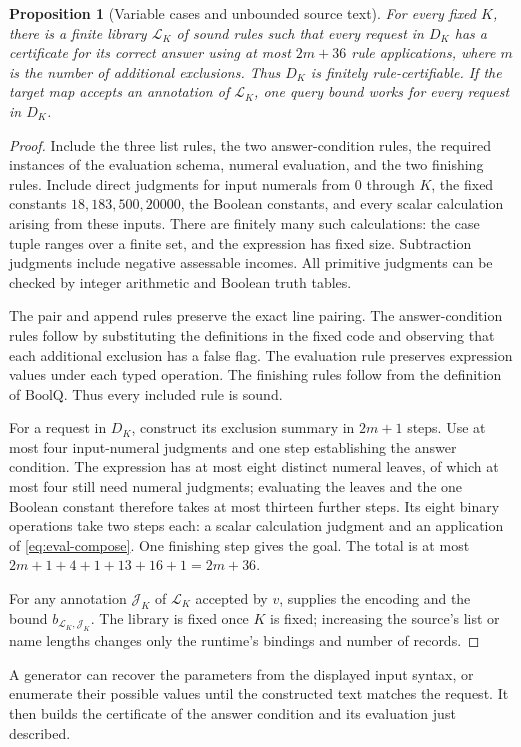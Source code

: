 \documentclass[11pt,twoside]{article}
\newtheorem{proposition}[theorem]{Proposition}
\theoremstyle{definition}
\newcommand{\Lib}{\mathcal L}
\newcommand{\Annot}{\mathcal J}
\begin{document}
\begin{proposition}[Variable cases and unbounded source text]
For every fixed $K$, there is a finite library $\Lib_K$ of sound rules such
that every request in $D_K$ has a certificate for its correct
answer using at most $2m+36$ rule applications, where $m$ is the number of
additional exclusions. Thus $D_K$ is finitely rule-certifiable. If the target
map accepts an annotation of $\Lib_K$, one query bound works for every request
in $D_K$.
\end{proposition}
\begin{proof}
Include the three list rules, the two answer-condition rules, the required
instances of the evaluation schema, numeral evaluation, and the two finishing
rules. Include direct judgments for input numerals from $0$ through $K$,
the fixed constants $18,183,500,20000$, the Boolean constants, and every scalar calculation
arising from these inputs. There are finitely many such calculations: the
case tuple ranges over a finite set, and the expression has fixed size.
Subtraction judgments include negative assessable incomes. All primitive judgments can be checked by integer arithmetic and Boolean
truth tables.

The pair and append rules preserve the exact line pairing. The answer-condition
rules follow by substituting the definitions in the fixed code and observing
that each additional exclusion has a false flag. The evaluation rule
preserves expression values under each typed operation. The finishing rules
follow from the definition of $\mathrm{BoolQ}$. Thus every included rule is
sound.

For a request in $D_K$, construct its exclusion summary in $2m+1$ steps.
Use at most four input-numeral judgments and one step establishing the answer condition. The expression
has at most eight distinct numeral leaves, of which at most four still
need numeral judgments; evaluating the leaves and the one Boolean constant
therefore takes at most thirteen further steps. Its eight binary operations
take two steps each: a scalar calculation judgment and an application of
\cref{eq:eval-compose}. One finishing step gives the goal. The total is
at most $2m+1+4+1+13+16+1=2m+36$.

For any annotation $\Annot_K$ of $\Lib_K$ accepted by $v$,
 supplies the encoding and the bound
$b_{\Lib_K,\Annot_K}$.
The library is fixed once $K$ is fixed; increasing the source's list or name
lengths changes only the runtime's bindings and number of records.
\end{proof}
A generator can recover the parameters from the displayed input syntax, or
enumerate their possible values until the constructed text matches the
request. It then builds the certificate of the answer condition and its
evaluation just described.
\end{document}
